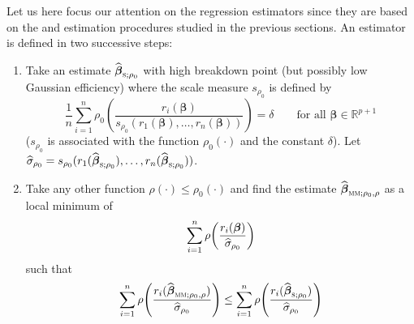Let us here focus our attention on the regression  estimators since
they are based on the  and  estimation procedures studied in
the previous sections. An  estimator is defined in two successive
steps:

\begin{enumerate}
    \item Take an  estimate $\sthat{\boldsymbol\beta}_{\stsc{S};\rho_{0}}$
    with high breakdown point (but possibly low Gaussian efficiency) where the scale
    measure $s_{\rho_{0}}$ is defined by
    \[
        \frac{1}{n} \sum_{i=1}^{n}\rho_{0}\left(\frac{r_{i}(\boldsymbol\beta)}
            {s_{\rho_{0}}(r_{1}(\boldsymbol\beta), \dots, r_{n}(\boldsymbol\beta))}\right) 
            = \delta
        \qquad\text{for all $\boldsymbol\beta\in\mathbb{R}^{p+1}$}
    \]
    ($s_{\rho_{0}}$ is associated with the function $\rho_{0}(\cdot)$ and the
    constant $\delta$). Let $\sthat{\sigma}_{\rho_{0}} =
    s_{\rho_{0}}(r_{1}(\sthat{\boldsymbol\beta}_{\stsc{S};\rho_{0}}),\allowbreak
    \dots,\allowbreak r_{n}(\sthat{\boldsymbol\beta}_{\stsc{S};\rho_{0}}))$.

    \item Take any other function $\rho(\cdot) \leq \rho_{0}(\cdot)$ and find
    the  estimate $\sthat{\boldsymbol\beta}_{\stsc{MM};\rho_{0},\rho}$
    as a local minimum of
    \begin{equation}\label{eq:MM_min}
        \sum_{i=1}^{n} \rho\left(\frac{r_{i}(\boldsymbol\beta)}{\sthat{\sigma}_{\rho_{0}}}\right)
    \end{equation}
    such that
    \begin{equation}\label{eq:MM_inequality}
        \sum_{i=1}^{n} \rho\left(\frac{r_{i}(\sthat{\boldsymbol\beta}_{\stsc{MM};\rho_{0},\rho})}
            {\sthat{\sigma}_{\rho_{0}}}\right)
     \leq \sum_{i=1}^{n}\rho\left(\frac{r_{i}(\sthat{\boldsymbol\beta}_{\stsc{S};\rho_{0}})}
         {\sthat{\sigma}_{\rho_{0}}}\right)
    \end{equation}
\end{enumerate}

